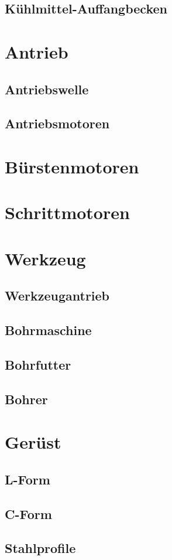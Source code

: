 \documentclass[
	a4paper,
	smallheadings,
	german,
	]
	{scrreprt}
\begin{document}
	\subsection{Kühlmittel-Auffangbecken}
\section{Antrieb}
	\subsection{Antriebswelle}
	\subsection{Antriebsmotoren}
		\section{Bürstenmotoren}
		\section{Schrittmotoren}
\section{Werkzeug}
	\subsection{Werkzeugantrieb}
	\subsection{Bohrmaschine}
		\subsection{Bohrfutter}
		\subsection{Bohrer}
\section{Gerüst}
	\subsection{L-Form}
	\subsection{C-Form}
\subsection{Stahlprofile}
\end{document}
